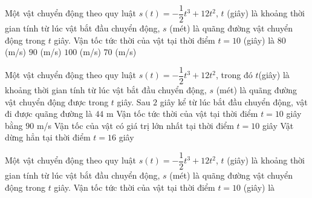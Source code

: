 \begin{ex}%
	Một vật  chuyển động theo quy luật $s(t)=-\dfrac{1}{2}t^3+12t^2$, $t$ (giây) là khoảng thời gian tính từ lúc vật bắt đầu chuyển động, $s$ (mét) là quãng đường vật chuyển động trong $t$ giây. Vận tốc tức thời của vật tại thời điểm $t=10$ (giây) là
	\choice 
		 {$80$ (m/s)}
		{\True  $90$ (m/s)}
		{$100$ (m/s)} 
		{$70$  (m/s)}
\end{ex}

\begin{ex}%
 Một vật chuyển động theo quy luật $s(t) = -\dfrac{1}{2} t^3 + 12t^2$, trong đó  $t$(giây) là khoảng thời gian tính từ lúc vật bắt đầu chuyển động, $s$ (mét) là quãng đường vật chuyển động được trong $t$ giây.
  \choiceTF
  {\True Sau $2$ giây kể từ lúc bắt đầu chuyển động, vật đi được quãng  đường là $44$ m}
  {\True Vận tốc tức thời của vật tại thời điểm $t =  10$ giây bằng $90$ m/s}
  {Vận tốc của vật có giá trị lớn  nhất tại thời điểm $t=10$ giây}
  {\True Vật dừng hẳn tại thời điểm $t=16$  giây}
\end{ex}

\begin{ex}%
	Một vật chuyển  động theo quy luật $s(t)=-\dfrac{1}{2}t^3+12t^2$, $t$ (giây) là khoảng thời gian tính từ lúc vật bắt đầu chuyển động, $s$ (mét) là quãng đường vật chuyển động trong $t$ giây. Vận tốc tức thời của vật tại thời điểm $t=10$ (giây) là
\end{ex}

